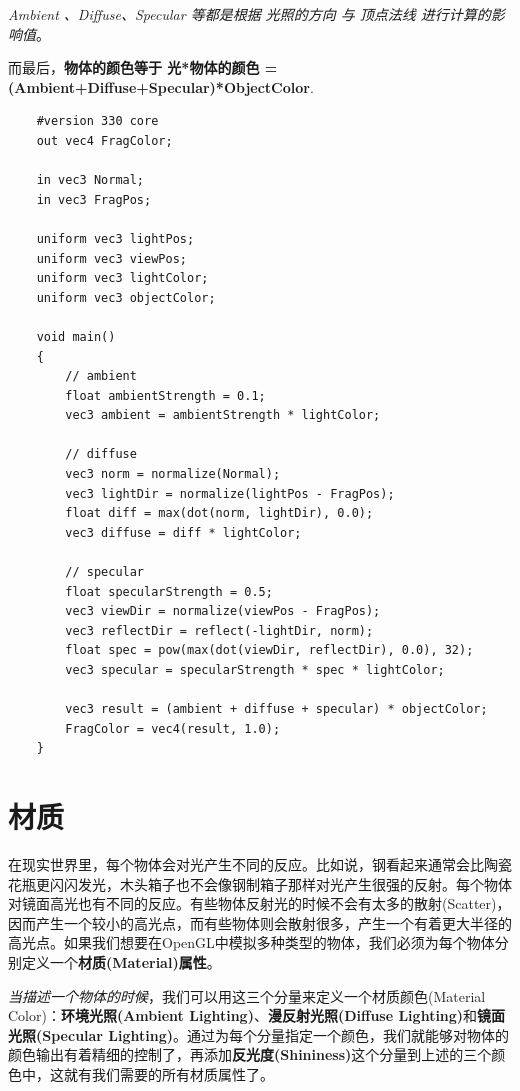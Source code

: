 \documentclass[UTF8,a4paper,12pt]{ctexbook}
\begin{document}
				\textit{Ambient 、Diffuse、Specular 等都是根据 光照的方向 与 顶点法线 进行计算的影响值}。
				
				而最后，\textbf{物体的颜色等于 光*物体的颜色 = (Ambient+Diffuse+Specular)*ObjectColor}.
				
				\begin{lstlisting}
	#version 330 core
	out vec4 FragColor;
	
	in vec3 Normal;  
	in vec3 FragPos;  
	  
	uniform vec3 lightPos; 
	uniform vec3 viewPos; 
	uniform vec3 lightColor;
	uniform vec3 objectColor;
	
	void main()
	{
	    // ambient
	    float ambientStrength = 0.1;
	    vec3 ambient = ambientStrength * lightColor;
	  	
	    // diffuse 
	    vec3 norm = normalize(Normal);
	    vec3 lightDir = normalize(lightPos - FragPos);
	    float diff = max(dot(norm, lightDir), 0.0);
	    vec3 diffuse = diff * lightColor;
	    
	    // specular
	    float specularStrength = 0.5;
	    vec3 viewDir = normalize(viewPos - FragPos);
	    vec3 reflectDir = reflect(-lightDir, norm);  
	    float spec = pow(max(dot(viewDir, reflectDir), 0.0), 32);
	    vec3 specular = specularStrength * spec * lightColor;  
	        
	    vec3 result = (ambient + diffuse + specular) * objectColor;
	    FragColor = vec4(result, 1.0);
	} 				
				\end{lstlisting}
			
			
			
	\section{材质}
		在现实世界里，每个物体会对光产生不同的反应。比如说，钢看起来通常会比陶瓷花瓶更闪闪发光，木头箱子也不会像钢制箱子那样对光产生很强的反射。每个物体对镜面高光也有不同的反应。有些物体反射光的时候不会有太多的散射(Scatter)，因而产生一个较小的高光点，而有些物体则会散射很多，产生一个有着更大半径的高光点。如果我们想要在OpenGL中模拟多种类型的物体，我们必须为每个物体分别定义一个\textbf{材质(Material)属性}。
		
		\textit{当描述一个物体的时候}，我们可以用这三个分量来定义一个材质颜色(Material Color)：\textbf{环境光照(Ambient Lighting)}、\textbf{漫反射光照(Diffuse Lighting)}和\textbf{镜面光照(Specular Lighting)}。通过为每个分量指定一个颜色，我们就能够对物体的颜色输出有着精细的控制了，再添加\textbf{反光度(Shininess)}这个分量到上述的三个颜色中，这就有我们需要的所有材质属性了。
		
\end{document}
